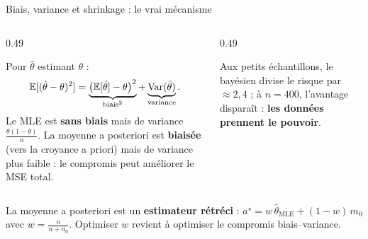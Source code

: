\begin{frame}{Biais, variance et shrinkage : le vrai mécanisme}
\begin{columns}[t]
\begin{column}{0.49\textwidth}
\begin{ebox}
Pour $\hat\theta$ estimant $\theta$ :
\[
\mathbb{E}[(\hat\theta - \theta)^2]
= \underbrace{\big(\mathbb{E}[\hat\theta] - \theta\big)^2}_{\text{biais}^2}
+ \underbrace{\mathrm{Var}(\hat\theta)}_{\text{variance}} .
\]
Le MLE est \textbf{sans biais} mais de variance $\frac{\theta(1-\theta)}{n}$.
La moyenne a posteriori est \textbf{biaisée} (vers la croyance a priori) mais de
variance plus faible : le compromis peut améliorer le MSE total.
\end{ebox}
\end{column}
\begin{column}{0.49\textwidth}
\begin{solbox}
\vspace{1.5mm}
\tiny Aux petits échantillons, le bayésien divise le risque par $\approx 2{,}4$ ;
à $n = 400$, l'avantage disparaît : \textbf{les données prennent le pouvoir}.
\end{solbox}
\end{column}
\end{columns}
\vspace{1mm}
\begin{kbox}
La moyenne a posteriori est un \textbf{estimateur rétréci} :
$a^\star = w\,\hat\theta_{\text{MLE}} + (1-w)\, m_0$ avec $w = \frac{n}{n+n_0}$.
Optimiser $w$ revient à optimiser le compromis biais--variance.
\end{kbox}
\end{frame}

